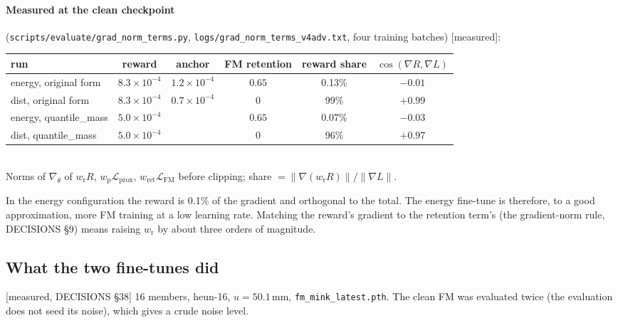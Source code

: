 \documentclass[11pt,a4paper]{article}
\newcommand{\status}[1]{\textsf{\small[#1]}}
\begin{document}
\paragraph{Measured at the clean checkpoint} (\texttt{scripts/evaluate/grad\_norm\_terms.py},
\texttt{logs/grad\_norm\_terms\_v4adv.txt}, four training batches) \status{measured}:
\begin{center}\small\begin{tabular}{lccccc}\toprule
run & reward & anchor & FM retention & reward share & $\cos(\nabla R,\nabla L)$\\\midrule
energy, original form & $8.3\times10^{-4}$ & $1.2\times10^{-4}$ & $0.65$ & 0.13\% & $-0.01$\\
dist, original form & $8.3\times10^{-4}$ & $0.7\times10^{-4}$ & 0 & 99\% & $+0.99$\\
energy, quantile\_mass & $5.0\times10^{-4}$ & & $0.65$ & 0.07\% & $-0.03$\\
dist, quantile\_mass & $5.0\times10^{-4}$ & & 0 & 96\% & $+0.97$\\\bottomrule
\end{tabular}\\[2pt]
{\footnotesize Norms of $\nabla_\theta$ of $w_{\mathrm r}R$, $w_{\mathrm p}\mathcal L_{\mathrm{prox}}$, $w_{\mathrm{ret}}\mathcal L_{\mathrm{FM}}$
before clipping; share $=\|\nabla(w_{\mathrm r}R)\|/\|\nabla L\|$.}
\end{center}

\noindent In the energy configuration the reward is 0.1\% of the gradient and orthogonal to the total. The energy
fine-tune is therefore, to a good approximation, more FM training at a low learning rate. Matching the reward's
gradient to the retention term's (the gradient-norm rule, DECISIONS \S9) means raising $w_{\mathrm r}$ by about three
orders of magnitude.

\subsection{What the two fine-tunes did}\label{sec:results}
\status{measured, DECISIONS \S38} 16 members, heun-16, $u = 50.1$\,mm, \texttt{fm\_mink\_latest.pth}. The clean FM was
evaluated twice (the evaluation does not seed its noise), which gives a crude noise level.
\end{document}
